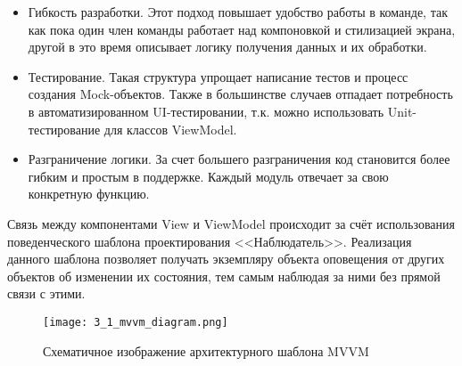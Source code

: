 \begin{itemize}
    \item Гибкость разработки.
    Этот подход повышает удобство работы в команде, так как пока один член команды работает над компоновкой и стилизацией экрана, другой в это время описывает логику получения данных и их обработки.
    \item Тестирование.
    Такая структура упрощает написание тестов и процесс создания Mock-объектов.
    Также в большинстве случаев отпадает потребность в автоматизированном UI-тестировании, т.к. можно использовать Unit-тестирование для классов ViewModel.
    \item Разграничение логики.
    За счет большего разграничения код становится более гибким и простым в поддержке.
    Каждый модуль отвечает за свою конкретную функцию.
\end{itemize}

Связь между компонентами View и ViewModel происходит за счёт использования поведенческого шаблона проектирования <<Наблюдатель>>.
Реализация данного шаблона позволяет получать экземпляру объекта оповещения от других объектов об изменении их состояния, тем самым наблюдая за ними без прямой связи с этими.

\begin{figure}[H]
    \centering
    \texttt{[image: 3\_1\_mvvm\_diagram.png]}
    \caption{Схематичное изображение архитектурного шаблона MVVM}
    \label{fig:design:architecture:mvvm}
\end{figure}